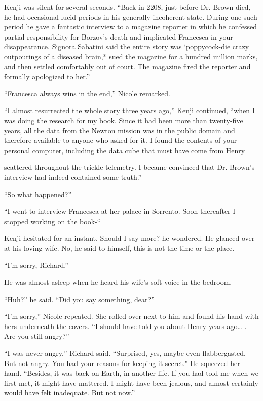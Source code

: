 \documentclass[]{article}
\begin{document}
{Kenji was silent for several seconds.  “Back in 2208, just before Dr.  Brown died, he had occasional lucid periods in his generally incoherent state.  During one such period he gave a fantastic interview to a magazine reporter in which he confessed partial responsibility for Borzov’s death and implicated Francesca in your disappearance.  Signora Sabatini said the entire story was ‘poppycock-die crazy outpourings of a diseased brain,* sued the magazine for a hundred million marks, and then settled comfortably out of court.  The magazine fired the reporter and formally apologized to her.”

“Francesca always wins in the end,” Nicole remarked.

“I almost resurrected the whole story three years ago,” Kenji continued, “when I was doing the research for my book.  Since it had been more than twenty-five years, all the data from the Newton mission was in the public domain and therefore available to anyone who asked for it.  I found the contents of your personal computer, including the data cube that must have come from Henry

scattered throughout the trickle telemetry.  I became convinced that Dr.  Brown’s interview had indeed contained some truth.”

“So what happened?”

“I went to interview Francesca at her palace in Sorrento.  Soon thereafter I stopped working on the book-“

Kenji hesitated for an instant.  Should I say more? he wondered.  He glanced over at his loving wife.  No, he said to himself, this is not the time or the place.

“I’m sorry, Richard.”

He was almost asleep when he heard his wife’s soft voice in the bedroom.

“Huh?” he said.  “Did you say something, dear?”

“I’m sorry,” Nicole repeated.  She rolled over next to him and found his hand with hers underneath the covers.  “I should have told you about Henry years ago… .  Are you still angry?”

“I was never angry,” Richard said.  “Surprised, yes, maybe even flabbergasted.  But not angry.  You had your reasons for keeping it secret."  He squeezed her hand.  “Besides, it was back on Earth, in another life.  If you had told me when we first met, it might have mattered.  I might have been jealous, and almost certainly would have felt inadequate.  But not now.”

}
\end{document}
